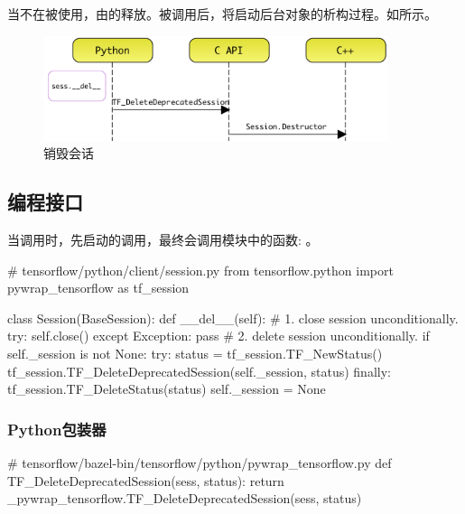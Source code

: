 \begin{content}

当不在被使用，由的释放。被调用后，将启动后台对象的析构过程。如所示。

\begin{figure}[!h]
\centering
\includegraphics[width=0.9\textwidth]{figures/py-delete-session.png}
\caption{销毁会话}
 \label{fig:py-delete-session}
\end{figure}

\subsection{编程接口}

当调用时，先启动的调用，最终会调用模块中的函数: 。

\begin{leftbar}
\begin{python}
# tensorflow/python/client/session.py
from tensorflow.python import pywrap_tensorflow as tf_session

class Session(BaseSession):
  def __del__(self):
    # 1. close session unconditionally.
    try:
      self.close()
    except Exception:
      pass
    # 2. delete session unconditionally.
    if self._session is not None:
      try:
        status = tf_session.TF_NewStatus()
        tf_session.TF_DeleteDeprecatedSession(self._session, status)
      finally:
        tf_session.TF_DeleteStatus(status)
      self._session = None
\end{python}
\end{leftbar}

\subsubsection{Python包装器}

\begin{leftbar}
\begin{python}
# tensorflow/bazel-bin/tensorflow/python/pywrap\_tensorflow.py
def TF_DeleteDeprecatedSession(sess, status):
  return _pywrap_tensorflow.TF_DeleteDeprecatedSession(sess, status)
\end{python}
\end{leftbar}


\end{content}
